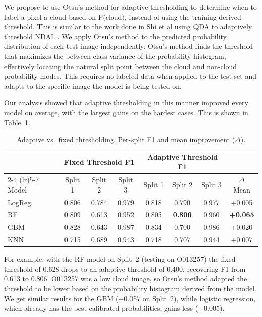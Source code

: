 \documentclass[11pt,letterpaper]{article}
\begin{document}
We propose to use Otsu's method for adaptive thresholding to determine when to label a pixel a cloud based on $\text{P(cloud)}$, instead of using the training-derived threshold. This is similar to the work done in Shi et al using QDA to adaptively threshold NDAI. \cite{Shi}. We apply Otsu's method to the predicted probability distribution of each test image independently. Otsu's method finds the threshold that maximizes the between-class variance of the probability histogram, effectively locating the natural split point between the cloud and non-cloud probability modes. This requires no labeled data when applied to the test set and adapts to the specific image the model is being tested on.

Our analysis showed that adaptive thresholding in this manner improved every model on average, with the largest gains on the hardest cases. This is shown in Table~\ref{tab:adaptive}.
 
\begin{table}[H]
\centering
\small
\begin{tabular}{lccccccc}
\toprule
& \multicolumn{3}{c}{Fixed Threshold F1} & \multicolumn{3}{c}{Adaptive Threshold F1} & \\
\cmidrule(lr){2-4} \cmidrule(lr){5-7}
Model & Split 1 & Split 2 & Split 3 & Split 1 & Split 2 & Split 3 & $\Delta$ Mean \\
\midrule
LogReg & 0.806 & 0.784 & 0.979 & 0.818 & 0.790 & 0.977 & +0.005 \\
RF & 0.809 & 0.613 & 0.952 & 0.805 & \textbf{0.806} & 0.960 & \textbf{+0.065} \\
GBM & 0.828 & 0.643 & 0.987 & 0.834 & 0.700 & 0.986 & +0.020 \\
KNN & 0.715 & 0.689 & 0.943 & 0.718 & 0.707 & 0.944 & +0.007 \\
\bottomrule
\end{tabular}
\caption{Adaptive vs.\ fixed thresholding. Per-split F1 and mean improvement ($\Delta$).}
\label{tab:adaptive}
\end{table}

For example, with the RF model on Split~2 (testing on O013257) the fixed threshold of 0.628 drops to an adaptive threshold of 0.400, recovering F1 from 0.613 to 0.806. O013257 was a low cloud image, so Otsu's method adapted the threshold to be lower based on the probability histogram derived from the model. We get similar results for the GBM (+0.057 on Split~2), while logistic regression, which already has the best-calibrated probabilities, gains less (+0.005).
\end{document}

